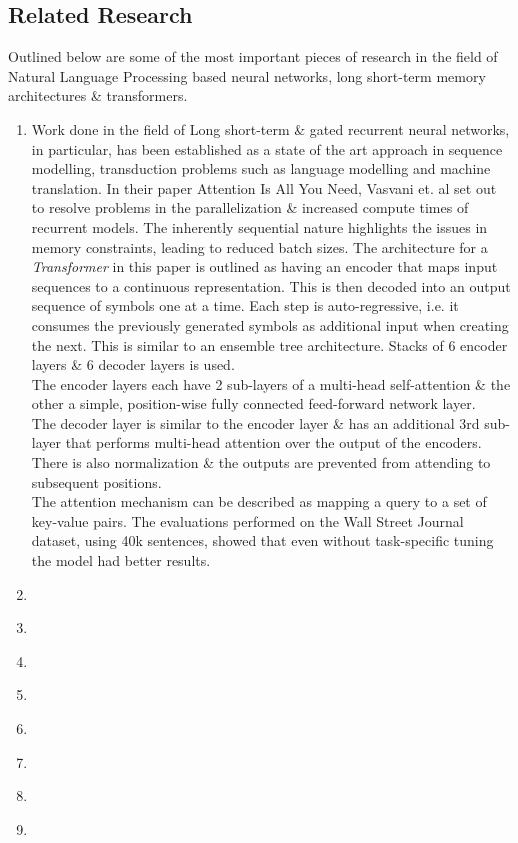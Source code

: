 \documentclass[11pt]{article}
\begin{document}
\subsection{Related Research}\label{rr}
Outlined below are some of the most important pieces of research in the field of Natural Language Processing based neural networks, long short-term memory architectures \& transformers.
\begin{enumerate}
    \item Work done in the field of Long short-term \& gated recurrent \cite{lstm,recurrent} neural networks, in particular, has been established as a state of the art approach in sequence modelling, transduction problems such as language modelling and machine translation.
    In their paper Attention Is All You Need,\cite{atayl} Vasvani et. al set out to resolve problems in the parallelization \& increased compute times of recurrent models. The inherently sequential nature highlights the issues in memory constraints, leading to reduced batch sizes.
    The architecture for a \textit{Transformer} in this paper is outlined as having an encoder that maps input sequences to a continuous representation. This is then decoded into an output sequence of symbols one at a time. Each step is auto-regressive, i.e. it consumes the previously generated symbols as additional input when creating the next. This is similar to an ensemble tree architecture. Stacks of 6 encoder layers \& 6 decoder layers is used.\\
    The encoder layers each have 2 sub-layers of a multi-head self-attention \& the other a simple, position-wise fully connected feed-forward network layer.\\
    The decoder layer is similar to the encoder layer \& has an additional 3rd sub-layer that performs multi-head attention over the output of the encoders. There is also normalization \&  the outputs are prevented from attending to subsequent positions. \\ The attention mechanism can be described as mapping a query to a set of key-value pairs\cite{atayl}. The evaluations performed on the Wall Street Journal dataset\cite{wsj}, using 40k sentences, showed that even without task-specific tuning the model had better results.

    \item \cite{dataset}
    \item \cite{bert}
    \item \cite{roberta}
    \item \cite{albert}
    \item \cite{schmid}
    \item \cite{levy}
    \item \cite{zhang}
    \item \cite{contextualized}
\end{enumerate}
\end{document}
